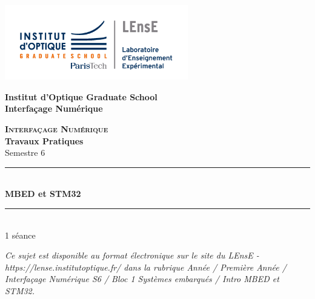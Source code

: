 \documentclass[a4paper,11pt,titlepage]{article} %
\begin{document}
\begin{titlepage}

\begin{center}
	\begin{minipage}{2.5cm}
	\begin{center}
		\includegraphics[width=8cm]{images/Logo-LEnsE.png}
	\end{center}
\end{minipage}\hfill
\begin{minipage}{10cm}
	\begin{center}
	\textbf{Institut d'Optique Graduate School }\\[0.1cm]
    \textbf{Interfaçage Numérique}


	\end{center}
\end{minipage}\hfill


\vspace{4cm}


{\huge \bfseries \textsc{Interfaçage Numérique}} \\[0.5cm]
{\large \bfseries Travaux Pratiques} \\[0.2cm]
Semestre 6

\vspace{2cm}
\rule{\linewidth}{0.3mm} \\[0.4cm]
{ \huge \bfseries\color{violet_iogs} MBED et STM32 \\[0.4cm] }
\rule{\linewidth}{0.3mm} \\[1cm]

1 séance

\bigskip

\begin{center}
\end{center}

\vfill

\textit{Ce sujet est disponible au format électronique sur le site du LEnsE - https://lense.institutoptique.fr/ dans la rubrique Année / Première Année / Interfaçage Numérique S6 / Bloc 1 Systèmes embarqués / Intro MBED et STM32.}


\end{center}
\end{titlepage}
\end{document}
